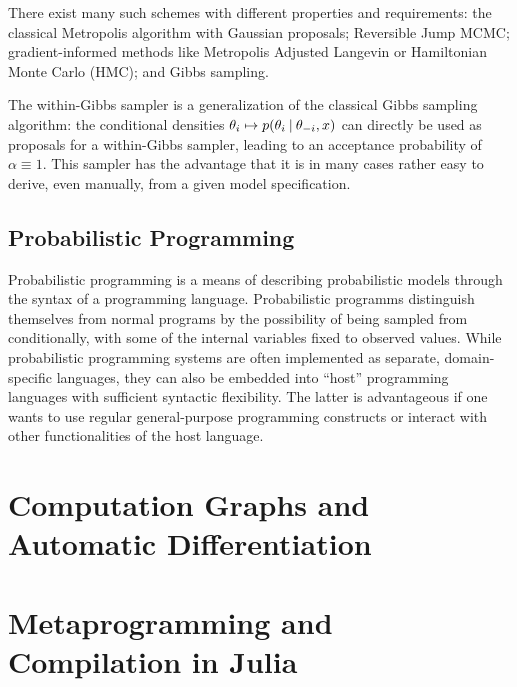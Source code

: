There exist many such schemes with different properties and requirements: the classical Metropolis
algorithm with Gaussian proposals; Reversible Jump MCMC; gradient-informed methods like Metropolis
Adjusted Langevin or Hamiltonian Monte Carlo (HMC); and Gibbs sampling.


The within-Gibbs sampler is a generalization of the classical Gibbs sampling algorithm: the
conditional densities \(\theta_{i} \mapsto p(\theta_{i} \:\vert\: \theta_{-i}, x)\) can directly be
used as proposals for a within-Gibbs sampler, leading to an acceptance probability of
\(\alpha \equiv 1\).  This sampler has the advantage that it is in many cases rather easy to derive,
even manually, from a given model specification.

\subsection{Probabilistic Programming}
\label{sec:prob-prog}

Probabilistic programming is a means of describing probabilistic models through the syntax of a
programming language. Probabilistic programms distinguish themselves from normal programs by the
possibility of being sampled from conditionally, with some of the internal variables fixed to
observed values.  While probabilistic programming systems are often implemented as separate,
domain-specific languages, they can also be embedded into \enquote{host} programming languages with
sufficient syntactic flexibility.  The latter is advantageous if one wants to use regular
general-purpose programming constructs or interact with other functionalities of the host language.




\section{Computation Graphs and Automatic Differentiation}
\label{sec:graph-track-autom}


\section{Metaprogramming and Compilation in Julia}
\label{sec:metapr-comp-julia}




